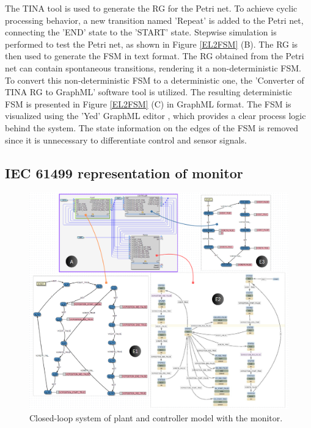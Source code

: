 \documentclass{ieeeojies}
\begin{document}
The TINA tool is used to generate the RG for the Petri net. To achieve cyclic processing behavior, a new transition named 'Repeat' is added to the Petri net, connecting the 'END' state to the 'START' state. Stepwise simulation is performed to test the Petri net, as shown in Figure \ref{EL2FSM} (B). The RG is then used to generate the FSM in text format. The RG obtained from the Petri net can contain spontaneous transitions, rendering it a non-deterministic FSM. To convert this non-deterministic FSM to a deterministic one, the 'Converter of TINA RG to GraphML' software tool \cite{xavier2022interactive} is utilized. The resulting deterministic FSM is presented in Figure \ref{EL2FSM} (C) in GraphML format. The FSM is visualized using the 'Yed' GraphML editor \cite{yworks}, which provides a clear process logic behind the system. The state information on the edges of the FSM is removed since it is unnecessary to differentiate control and sensor signals.



\subsection{IEC 61499 representation of monitor}


\begin{figure}[!t]
	\centering
	\includegraphics[width=1\textwidth]{images/CLMC.PNG}
	\caption{Closed-loop system of plant and controller model with the monitor.}
	\label{CL_plant_controller_monitor}
\end{figure}
\end{document}
